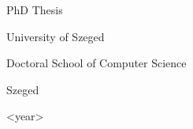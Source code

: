\documentclass[a4paper,12pt]{article}
\begin{document}
	
\begin{center}
	
	
	\vspace*{6em}

	{\Huge PhD Thesis}
	
	\vfill
	
	{\LARGE <Firstname Lastname> }
	
	\vspace*{6em}
	
	{\Large University of Szeged}
	
	{\Large Doctoral School of Computer Science}
	
	\vfill
	
	\vspace*{4em}
	
	{\Large Szeged}
	
	{\Large <year>}
\end{center}
	
\end{document}
